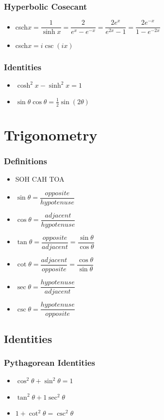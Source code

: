 \documentclass[]{report}
\newcommand \tab[1][1cm]{\hspace*{#1}}
\newcommand{\itemt}{\item \tab}
\begin{document}
\subsubsection{Hyperbolic Cosecant}	
\begin{itemize}
\itemt csch\(x = \dfrac{1}{\sinh x} = \dfrac{2}{e^x - e^{-x}} = \dfrac{2e^x}{e^{2x}-1} = \dfrac{2e^{-x}}{1-e^{-2x}} \)
\itemt csch\(x = i\csc(ix) \)
\end{itemize}				

\subsubsection{Identities}			
\begin{itemize}
\itemt \( \cosh^2x - \sinh^2x = 1 \)
\itemt \( \sin\theta \cos\theta = \frac{1}{2}\sin(2\theta) \)
\end{itemize}
			

	\section{Trigonometry}


\subsubsection{Definitions}
\begin{itemize}
\itemt SOH CAH TOA
\itemt \( \sin\theta = \dfrac{opposite}{hypotenuse} \)
\itemt \( \cos\theta = \dfrac{adjacent}{hypotenuse} \)
\itemt \( \tan\theta = \dfrac{opposite}{adjacent} = \dfrac{\sin\theta}{\cos\theta} \)
\itemt \( \cot\theta = \dfrac{adjacent}{opposite} = \dfrac{\cos\theta}{\sin\theta} \)
\itemt \( \sec\theta = \dfrac{hypotenuse}{adjacent} \)
\itemt \( \csc\theta = \dfrac{hypotenuse}{opposite} \)
\end{itemize}

\subsection{Identities}

\subsubsection{Pythagorean Identities}
\begin{itemize}
\itemt \( \cos^2\theta+\sin^2\theta = 1 \)
\itemt \( \tan^2\theta + 1 \sec^2 \theta \)
\itemt \( 1 + \cot^2 \theta = \csc^2 \theta \)

\end{itemize}
\end{document}
